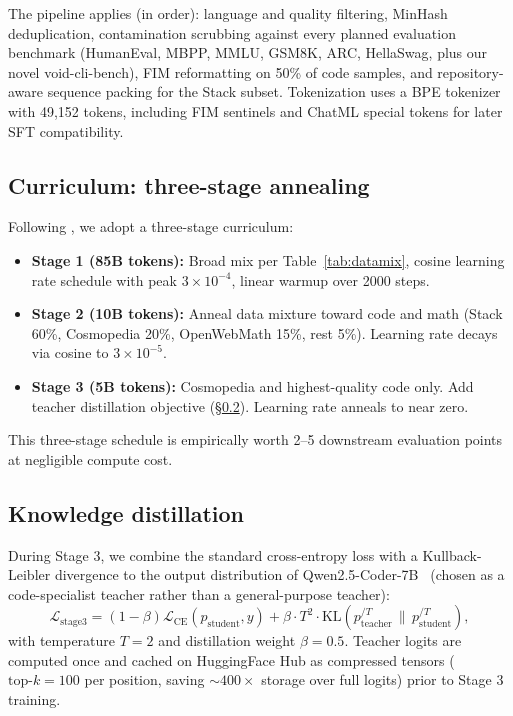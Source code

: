 \documentclass[11pt,a4paper]{article}
\theoremstyle{definition}
\theoremstyle{remark}
\begin{document}
The pipeline applies (in order): language and quality filtering,
MinHash deduplication, contamination scrubbing against every planned
evaluation benchmark (HumanEval, MBPP, MMLU, GSM8K, ARC, HellaSwag,
plus our novel void-cli-bench), FIM reformatting on 50\% of code
samples, and repository-aware sequence packing for the Stack subset.
Tokenization uses a BPE tokenizer with 49{,}152 tokens, including FIM
sentinels and ChatML special tokens for later SFT compatibility.

\subsection{Curriculum: three-stage annealing}

Following \citet{allal2025smollm2}, we adopt a three-stage curriculum:
\begin{itemize}[leftmargin=1.5em,itemsep=0.2em]
    \item \textbf{Stage 1 (85B tokens):} Broad mix per
          Table~\ref{tab:datamix}, cosine learning rate schedule with
          peak $3 \times 10^{-4}$, linear warmup over 2000 steps.
    \item \textbf{Stage 2 (10B tokens):} Anneal data mixture toward
          code and math (Stack 60\%, Cosmopedia 20\%, OpenWebMath 15\%,
          rest 5\%). Learning rate decays via cosine to $3 \times 10^{-5}$.
    \item \textbf{Stage 3 (5B tokens):} Cosmopedia and highest-quality
          code only. Add teacher distillation objective
          (\S\ref{sec:distill}). Learning rate anneals to near zero.
\end{itemize}
This three-stage schedule is empirically worth 2--5 downstream evaluation
points at negligible compute cost.

\subsection{Knowledge distillation}
\label{sec:distill}

During Stage 3, we combine the standard cross-entropy loss with a
Kullback-Leibler divergence to the output distribution of
Qwen2.5-Coder-7B~\citep{hui2024qwen25coder} (chosen as a code-specialist
teacher rather than a general-purpose teacher):
\begin{equation}
\mathcal{L}_\text{stage3}
   = (1 - \beta) \mathcal{L}_\text{CE}(p_\text{student}, y)
   + \beta \cdot T^2 \cdot \mathrm{KL}(p_\text{teacher}^{/T}
                                         \, \| \, p_\text{student}^{/T}),
\end{equation}
with temperature $T = 2$ and distillation weight $\beta = 0.5$.
Teacher logits are computed once and cached on HuggingFace Hub as
compressed tensors ($\text{top-}k=100$ per position, saving $\sim 400\times$
storage over full logits) prior to Stage 3 training.
\end{document}
